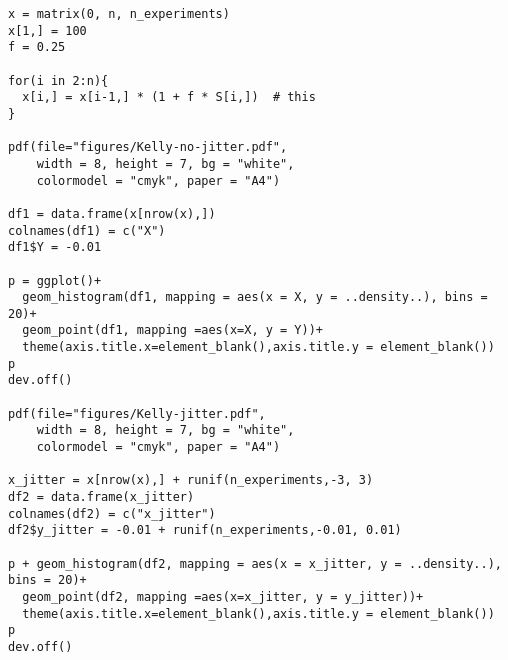 \begin{exercise}
\begin{verbatim}
x = matrix(0, n, n_experiments)
x[1,] = 100
f = 0.25

for(i in 2:n){
  x[i,] = x[i-1,] * (1 + f * S[i,])  # this
}

pdf(file="figures/Kelly-no-jitter.pdf",
    width = 8, height = 7, bg = "white",          
    colormodel = "cmyk", paper = "A4")

df1 = data.frame(x[nrow(x),])
colnames(df1) = c("X")
df1$Y = -0.01

p = ggplot()+
  geom_histogram(df1, mapping = aes(x = X, y = ..density..), bins = 20)+
  geom_point(df1, mapping =aes(x=X, y = Y))+
  theme(axis.title.x=element_blank(),axis.title.y = element_blank())
p
dev.off()

pdf(file="figures/Kelly-jitter.pdf",
    width = 8, height = 7, bg = "white",          
    colormodel = "cmyk", paper = "A4")

x_jitter = x[nrow(x),] + runif(n_experiments,-3, 3)
df2 = data.frame(x_jitter)
colnames(df2) = c("x_jitter")
df2$y_jitter = -0.01 + runif(n_experiments,-0.01, 0.01)

p + geom_histogram(df2, mapping = aes(x = x_jitter, y = ..density..), bins = 20)+
  geom_point(df2, mapping =aes(x=x_jitter, y = y_jitter))+
  theme(axis.title.x=element_blank(),axis.title.y = element_blank())
p
dev.off()
\end{verbatim}


\end{exercise}



